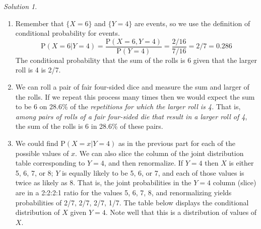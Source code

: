 \documentclass[
  letterpaper,
  DIV=11,
  numbers=noendperiod]{scrreprt}
\theoremstyle{plain}
\theoremstyle{definition}
\theoremstyle{definition}
\theoremstyle{definition}
\theoremstyle{remark}
\newtheorem{refsolution}{Solution}[chapter]
\begin{document}
\begin{tcolorbox}[enhanced jigsaw, opacityback=0, rightrule=.15mm, coltitle=black, colframe=quarto-callout-tip-color-frame, toprule=.15mm, colbacktitle=quarto-callout-tip-color!10!white, opacitybacktitle=0.6, left=2mm, toptitle=1mm, breakable, title={Solution (click to expand)}, bottomtitle=1mm, colback=white, leftrule=.75mm, titlerule=0mm, arc=.35mm, bottomrule=.15mm]

\begin{refsolution}
\leavevmode

\begin{enumerate}
\def\labelenumi{\arabic{enumi}.}
\item
  Remember that \(\{X=6\}\) and \(\{Y=4\}\) are events, so we use the
  definition of conditional probability for events. \[
  \textrm{P}(X = 6 | Y = 4) =\frac{\textrm{P}(X = 6, Y = 4)}{\textrm{P}(Y=4)} = \frac{2/16}{7/16} = 2/7 =0.286
  \] The conditional probability that the sum of the rolls is 6 given
  that the larger roll is 4 is 2/7.
\item
  We can roll a pair of fair four-sided dice and measure the sum and
  larger of the rolls. If we repeat this process many times then we
  would expect the sum to be 6 on 28.6\% of the \emph{repetitions for
  which the larger roll is 4.} That is, \emph{among pairs of rolls of a
  fair four-sided die that result in a larger roll of 4}, the sum of the
  rolls is 6 in 28.6\% of these pairs.
\item
  We could find \(\textrm{P}(X= x|Y=4)\) as in the previous part for
  each of the possible values of \(x\). We can also slice the column of
  the joint distribution table corresponding to \(Y=4\), and then
  renormalize. If \(Y = 4\) then \(X\) is either 5, 6, 7, or 8; \(Y\) is
  equally likely to be 5, 6, or 7, and each of those values is twice as
  likely as 8. That is, the joint probabilities in the \(Y=4\) column
  (slice) are in a 2:2:2:1 ratio for the values 5, 6, 7, 8, and
  renormalizing yields probabilities of 2/7, 2/7, 2/7, 1/7. The table
  below displays the conditional distribution of \(X\) given \(Y=4\).
  Note well that this is a distribution of values of \(X\).


\end{enumerate}
\end{refsolution}
\end{tcolorbox}
\end{document}
